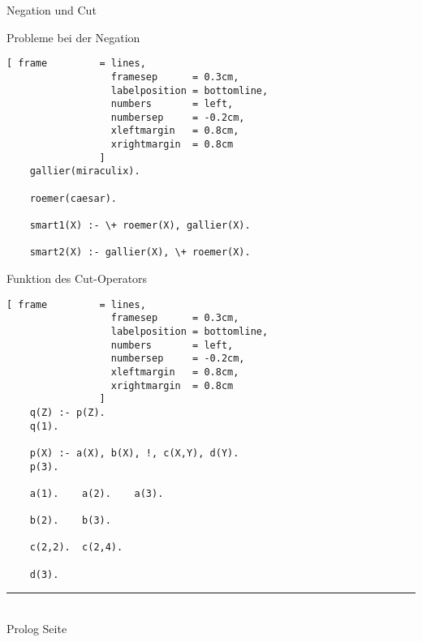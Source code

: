 \documentclass{slides}
\newcommand{\myrule}{\rule{20cm}{1mm}\\ }
\newcounter{mypage}
\begin{document}
\begin{slide}{}
\normalsize
\begin{center}
Negation und Cut
\end{center}
\vspace{0.5cm}

\footnotesize
Probleme bei der Negation
\begin{Verbatim}[ frame         = lines, 
                  framesep      = 0.3cm, 
                  labelposition = bottomline,
                  numbers       = left,
                  numbersep     = -0.2cm,
                  xleftmargin   = 0.8cm,
                  xrightmargin  = 0.8cm
                ]
    gallier(miraculix).
    
    roemer(caesar).
    
    smart1(X) :- \+ roemer(X), gallier(X).
    
    smart2(X) :- gallier(X), \+ roemer(X).
\end{Verbatim}
\vspace{0.5cm}

Funktion des Cut-Operators
\begin{Verbatim}[ frame         = lines, 
                  framesep      = 0.3cm, 
                  labelposition = bottomline,
                  numbers       = left,
                  numbersep     = -0.2cm,
                  xleftmargin   = 0.8cm,
                  xrightmargin  = 0.8cm
                ]
    q(Z) :- p(Z).
    q(1).

    p(X) :- a(X), b(X), !, c(X,Y), d(Y).    
    p(3).
    
    a(1).    a(2).    a(3).
    
    b(2).    b(3).
    
    c(2,2).  c(2,4).
    
    d(3).
\end{Verbatim}



\vspace*{\fill}
\tiny \addtocounter{mypage}{1}
\myrule
Prolog  \hspace*{\fill} Seite 
\end{slide}

\end{document}

